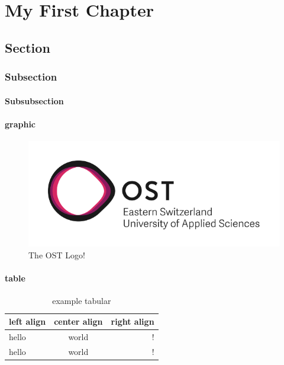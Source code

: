 

\chapter{My First Chapter}

\section{Section}



\subsection{Subsection}


\subsubsection{Subsubsection}
\lipsum[1]



\subsubsection{graphic}
\begin{figure}[h]
    \centering
    \includegraphics[scale=0.5]{img/OST_Icon}
    \caption{The OST Logo!}
\end{figure}

\subsubsection{table}
\begin{table}[h]
    \centering
    \caption{example tabular}
    \label{tab:example tabular}
        \begin{tabular}{l | c | r}
            \hline
            left align & center align & right align\\ \hline
            \hline
            hello & world & !\\ \hline
            hello & world & !\\ \hline
        \end{tabular}
\end{table}

